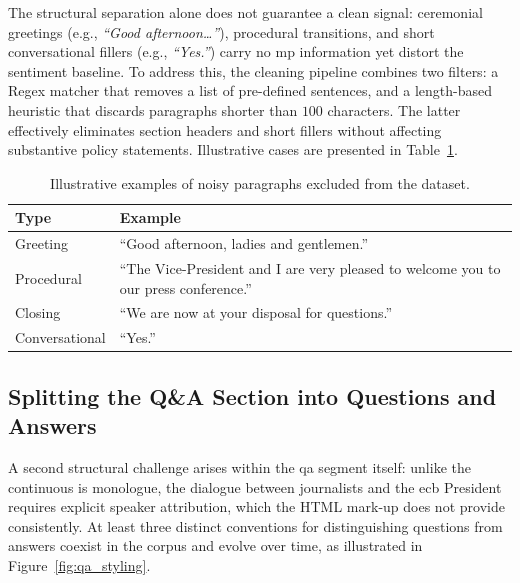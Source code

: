 The structural separation alone does not guarantee a clean signal: ceremonial greetings (e.g., \textit{``Good afternoon\ldots''}), procedural transitions, and short conversational fillers (e.g., \textit{``Yes.''}) carry no \gls{mp} information yet distort the sentiment baseline. To address this, the cleaning pipeline combines two filters: a Regex matcher that removes a list of pre-defined sentences, and a length-based heuristic that discards paragraphs shorter than $100$ characters. The latter effectively eliminates section headers and short fillers without affecting substantive policy statements. Illustrative cases are presented in Table~\ref{tab:redundant}.

\begin{table}[ht]
    \centering
    \caption[Illustrative examples of noisy paragraphs excluded from the dataset]{Illustrative examples of noisy paragraphs excluded from the dataset.}
    \label{tab:redundant}
    \begin{tabular}{@{}lp{8cm}@{}}
        \toprule
        \textbf{Type}  & \textbf{Example}                                                                      \\ \midrule
        Greeting       & ``Good afternoon, ladies and gentlemen.''                                             \\ \addlinespace
        Procedural     & ``The Vice-President and I are very pleased to welcome you to our press conference.'' \\ \addlinespace
        Closing        & ``We are now at your disposal for questions.''                                        \\ \addlinespace
        Conversational & ``Yes.''                                                                              \\ \bottomrule
    \end{tabular}
\end{table}

\subsection{Splitting the Q\&A Section into Questions and Answers}
\label{sec:data_qa_construction}

A second structural challenge arises within the \gls{qa} segment itself: unlike the continuous \gls{is} monologue, the dialogue between journalists and the \gls{ecb} President requires explicit speaker attribution, which the HTML mark-up does not provide consistently. At least three distinct conventions for distinguishing questions from answers coexist in the corpus and evolve over time, as illustrated in Figure~\ref{fig:qa_styling}.

